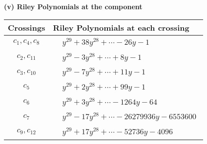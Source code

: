 \documentclass[1p]{elsarticle_modified}
\theoremstyle{definition}
\begin{document}
\flushleft \textbf{(v) Riley Polynomials at the component}\newline \\
\begin{tabular}{m{50pt}|m{274pt}}
Crossings & \hspace{64pt}Riley Polynomials at each crossing \\
\hline $$\begin{aligned}c_{1},c_{4},c_{8}\end{aligned}$$&$\begin{aligned}
&y^{29}+38 y^{28}+\cdots-26 y-1
\end{aligned}$\\
\hline $$\begin{aligned}c_{2},c_{11}\end{aligned}$$&$\begin{aligned}
&y^{29}-3 y^{28}+\cdots+8 y-1
\end{aligned}$\\
\hline $$\begin{aligned}c_{3},c_{10}\end{aligned}$$&$\begin{aligned}
&y^{29}-7 y^{28}+\cdots+11 y-1
\end{aligned}$\\
\hline $$\begin{aligned}c_{5}\end{aligned}$$&$\begin{aligned}
&y^{29}+2 y^{28}+\cdots+99 y-1
\end{aligned}$\\
\hline $$\begin{aligned}c_{6}\end{aligned}$$&$\begin{aligned}
&y^{29}+3 y^{28}+\cdots-1264 y-64
\end{aligned}$\\
\hline $$\begin{aligned}c_{7}\end{aligned}$$&$\begin{aligned}
&y^{29}-17 y^{28}+\cdots-26279936 y-6553600
\end{aligned}$\\
\hline $$\begin{aligned}c_{9},c_{12}\end{aligned}$$&$\begin{aligned}
&y^{29}+17 y^{28}+\cdots-52736 y-4096
\end{aligned}$\\
\hline
\end{tabular}\\~\\
\end{document}
